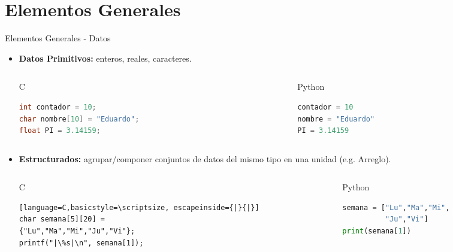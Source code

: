 \documentclass{beamer}
\begin{document}
\section{Elementos Generales}
\begin{frame}[fragile]{Elementos Generales - Datos}
\begin{itemize}
	\footnotesize
	\item \textbf{Datos Primitivos:} enteros, reales, caracteres.
	\vspace{-.45cm}
	\begin{columns}[t]
		\begin{column}{5.1cm}
		\begin{exampleblock}{C}
		\begin{lstlisting}[language=C,basicstyle=\scriptsize]
int contador = 10;
char nombre[10] = "Eduardo";
float PI = 3.14159;
		\end{lstlisting}
		\end{exampleblock}
		\end{column}
		\begin{column}{5.1cm}
		\begin{block}{Python}
		\begin{lstlisting}[language=Python, basicstyle=\scriptsize]
contador = 10
nombre = "Eduardo"
PI = 3.14159
		\end{lstlisting}
		\end{block}
		\end{column}
	\end{columns}
	\vspace{.15cm}
	\item \textbf{Estructurados:} agrupar/componer conjuntos de datos del mismo tipo en una unidad (e.g. Arreglo). 
	\vspace{-.45cm}
	\begin{columns}[t]
		\begin{column}{5.1cm}
		\begin{exampleblock}{C}
		\begin{lstlisting}[language=C,basicstyle=\scriptsize, escapeinside={|}{|}]
char semana[5][20] =
{"Lu","Ma","Mi","Ju","Vi"};
printf("|\%s|\n", semana[1]);
		\end{lstlisting}
		\end{exampleblock}
		\end{column}
		\begin{column}{5.1cm}
		\begin{block}{Python}
		\begin{lstlisting}[language=Python,basicstyle=\scriptsize]
semana = ["Lu","Ma","Mi",
          "Ju","Vi"]
print(semana[1])
		\end{lstlisting}
		\end{block}
		\end{column}
	\end{columns}
	\vspace{.15cm}
\end{itemize}
\end{frame}
\end{document}
